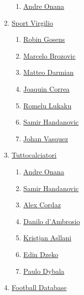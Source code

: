 \begin{enumerate}
\begin{enumerate}
        \item \href{https://www.inter.it/it/squadra/prima-squadra/andre-onana}{Andre Onana}
    \end{enumerate}
    \item \href{https://sport.virgilio.it/calcio/giocatori/}{Sport Virgilio}\label{it:prod3}
    \begin{enumerate}
        \item \href{https://sport.virgilio.it/calcio/giocatori/robin_gosens/}{Robin Gosens}
        \item \href{https://sport.virgilio.it/calcio/giocatori/marcelo_brozovic/}{Marcelo Brozovic}
        \item \href{https://sport.virgilio.it/calcio/giocatori/matteo_darmian/}{Matteo Darmian}
        \item \href{https://sport.virgilio.it/calcio/giocatori/joaquin_correa/}{Joaquin Correa}
        \item \href{https://sport.virgilio.it/calcio/giocatori/romelu_lukaku/}{Romelu Lukaku}
        \item \href{https://sport.virgilio.it/calcio/giocatori/samir_handanovic/}{Samir Handanovic}
        \item \href{https://sport.virgilio.it/calcio/giocatori/johan_vasquez/}{Johan Vasquez}
    \end{enumerate}
    \item \href{https://www.tuttocalciatori.net/rosa/f.c.-internazionale}{Tuttocalciatori}
    \begin{enumerate}
        \item \href{https://www.tuttocalciatori.net/Onana_Andr%E8}{Andre Onana}
        \item \href{https://www.tuttocalciatori.net/Handanovic_Samir}{Samir Handanovic}
        \item \href{https://www.tuttocalciatori.net/Cordaz_Alex}{Alex Cordaz}
        \item \href{https://www.tuttocalciatori.net/?mod=cc1&par=5646}{Danilo d'Ambrosio}
        \item \href{https://www.tuttocalciatori.net/Asllani_Kristjan}{Kristjan Asllani}
        \item \href{https://www.tuttocalciatori.net/Dzeko_Edin}{Edin Dzeko}
        \item \href{https://www.tuttocalciatori.net/Dybala_Paulo}{Paulo Dybala}
    \end{enumerate}
    \item \href{https://www.footballdatabase.eu/en/club/team/16-inter_milan/2022-2023}{Football Database}

\end{enumerate}
